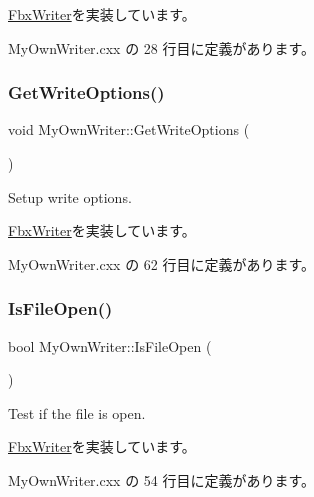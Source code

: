 \hyperlink{class_fbx_writer_abe6729227cd6e3be5ee3ab0c1b8b0eda}{Fbx\+Writer}を実装しています。



 My\+Own\+Writer.\+cxx の 28 行目に定義があります。

\mbox{\label{class_my_own_writer_a2e3d99525964397118372f3f685e9dde}} 
\subsubsection{\texorpdfstring{Get\+Write\+Options()}{GetWriteOptions()}}
{\footnotesize\ttfamily void My\+Own\+Writer\+::\+Get\+Write\+Options (\begin{DoxyParamCaption}{ }\end{DoxyParamCaption})\hspace{0.3cm}{\ttfamily [virtual]}}

Setup write options. 

\hyperlink{class_fbx_writer_ad237f5cd183ae29f744aee32b7aa5525}{Fbx\+Writer}を実装しています。



 My\+Own\+Writer.\+cxx の 62 行目に定義があります。

\mbox{\label{class_my_own_writer_a09f75dc6a30ecdb00927253a7f69eae8}} 
\subsubsection{\texorpdfstring{Is\+File\+Open()}{IsFileOpen()}}
{\footnotesize\ttfamily bool My\+Own\+Writer\+::\+Is\+File\+Open (\begin{DoxyParamCaption}{ }\end{DoxyParamCaption})\hspace{0.3cm}{\ttfamily [virtual]}}

Test if the file is open. 

\hyperlink{class_fbx_writer_ab70be3aaebd304af11cdce5e225cce68}{Fbx\+Writer}を実装しています。



 My\+Own\+Writer.\+cxx の 54 行目に定義があります。

